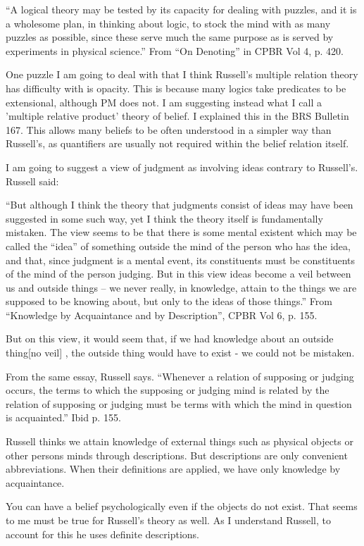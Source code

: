 \documentclass[12pt]{article}
\begin{document}
“A logical theory may be tested by its capacity for dealing with puzzles, and it is a wholesome plan, in thinking about logic, to stock the mind with as many puzzles as possible, since these serve much the same purpose as is served by experiments in physical science.” From “On Denoting” in CPBR Vol 4, p. 420.

One puzzle I am going to deal with that I think Russell's multiple relation theory has difficulty with is opacity. This is because many logics take predicates to be extensional, although PM does not. I am suggesting instead what I call a 'multiple relative product' theory of belief. I explained this in the BRS Bulletin 167. This allows many beliefs to be often understood in a simpler way than Russell's, as quantifiers are usually not required within the belief relation itself. 

I am going to suggest a view of judgment as involving ideas contrary to Russell’s. Russell said:

“But although I think the theory that judgments consist of ideas may have been suggested in some such way, yet I think the theory itself is fundamentally mistaken. The view seems to be that there is some mental existent which may be called the “idea” of something outside the mind of the person who has the idea, and that, since judgment is a mental event, its constituents must be constituents of the mind of the person judging. But in this view ideas become a veil between us and outside things – we never really, in knowledge, attain to the things we are supposed to be knowing about, but only to the ideas of those things.”   From “Knowledge by Acquaintance and by Description”, CPBR Vol 6, p. 155.

But on this view, it would seem that, if we had knowledge about an outside thing[no veil] , the outside thing would have to exist - we could not be mistaken.

From the same essay, Russell says. 
“Whenever a relation of supposing or judging occurs, the terms to which the supposing or judging mind is related by the relation of supposing or judging must be terms with which the mind in question is acquainted.” Ibid p. 155.

Russell thinks we attain knowledge of external things such as physical objects or other persons minds through descriptions. But descriptions are only convenient abbreviations. When their definitions are applied, we have only knowledge by acquaintance.

You can have a belief psychologically even if the objects do not exist. That seems to me must be true for Russell’s theory as well. As I understand Russell, to account for this he uses definite descriptions.
\end{document}

